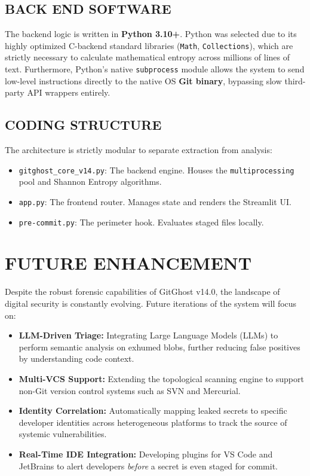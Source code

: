 \documentclass[12pt, a4paper, oneside]{report}
\begin{document}
\section{BACK END SOFTWARE}
The backend logic is written in \textbf{Python 3.10+}. Python was selected due to its highly optimized C-backend standard libraries (\texttt{Math}, \texttt{Collections}), which are strictly necessary to calculate mathematical entropy across millions of lines of text. Furthermore, Python's native \texttt{subprocess} module allows the system to send low-level instructions directly to the native OS \textbf{Git binary}, bypassing slow third-party API wrappers entirely.

\section{CODING STRUCTURE}
The architecture is strictly modular to separate extraction from analysis:
\begin{itemize}
    \item \texttt{gitghost\_core\_v14.py}: The backend engine. Houses the \texttt{multiprocessing} pool and Shannon Entropy algorithms.
    \item \texttt{app.py}: The frontend router. Manages state and renders the Streamlit UI.
    \item \texttt{pre-commit.py}: The perimeter hook. Evaluates staged files locally.
\end{itemize}

\chapter{FUTURE ENHANCEMENT}
Despite the robust forensic capabilities of GitGhost v14.0, the landscape of digital security is constantly evolving. Future iterations of the system will focus on:
\begin{itemize}
    \item \textbf{LLM-Driven Triage:} Integrating Large Language Models (LLMs) to perform semantic analysis on exhumed blobs, further reducing false positives by understanding code context.
    \item \textbf{Multi-VCS Support:} Extending the topological scanning engine to support non-Git version control systems such as SVN and Mercurial.
    \item \textbf{Identity Correlation:} Automatically mapping leaked secrets to specific developer identities across heterogeneous platforms to track the source of systemic vulnerabilities.
    \item \textbf{Real-Time IDE Integration:} Developing plugins for VS Code and JetBrains to alert developers \textit{before} a secret is even staged for commit.
\end{itemize}
\end{document}
